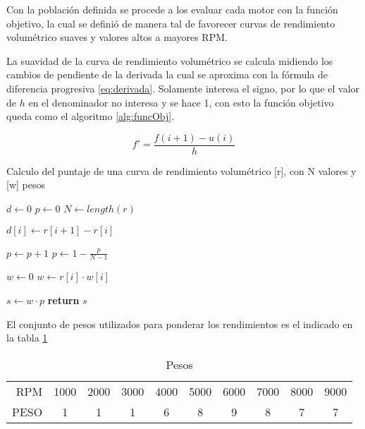 Con la población definida se procede a los evaluar cada motor con la función
objetivo, la cual se definió de manera tal de favorecer curvas de rendimiento
volumétrico suaves y valores altos a mayores RPM.

La suavidad de la curva de rendimiento volumétrico se calcula midiendo los
cambios de pendiente de la derivada la cual se aproxima con la fórmula de
diferencia progresiva \ref{eq:derivada}.
%
Solamente interesa el signo, por lo que el valor de $h$ en el denominador no
interesa y se hace 1, con esto la función objetivo queda como el algoritmo
\ref{alg:funcObj}.

\begin{equation}
  f' = \frac{f(i+1) - u(i)}{h}
  \label{eq:derivada}
\end{equation}


\begin{algorithm}
\caption{Calculo del puntaje de una curva de rendimiento volumétrico [r], con N valores y [w] pesos}\label{alg:funcObj}
\begin{algorithmic}[1]
  \State $d\gets 0$
  \State $p\gets 0$
  \State $N\gets length(r)$

    \State $d[i]\gets r[i+1]-r[i]$
  \EndFor

      \State $p\gets p + 1$
    \EndIf
  \EndFor
  \State $p \gets 1 - \frac{p}{N-1}$

  \State $w \gets 0$
    \State $w \gets r[i] \cdot w[i]$
  \EndFor

  \State $s \gets w \cdot p$
  \State \textbf{return} $s$
\EndProcedure
\end{algorithmic}
\end{algorithm}

El conjunto de pesos utilizados para ponderar los rendimientos es el indicado en la tabla \ref{tab:pesos}
\begin{table}
  \centering
  \begin{tabular}{rccccccccc}
    RPM  & 1000 & 2000 & 3000 & 4000 & 5000 & 6000 & 7000 & 8000 & 9000 \\
    PESO & 1    & 1    & 1    & 6    & 8    & 9    & 8    & 7    & 7 \\
  \end{tabular}
  \caption{Pesos}
  \label{tab:pesos}
\end{table}


